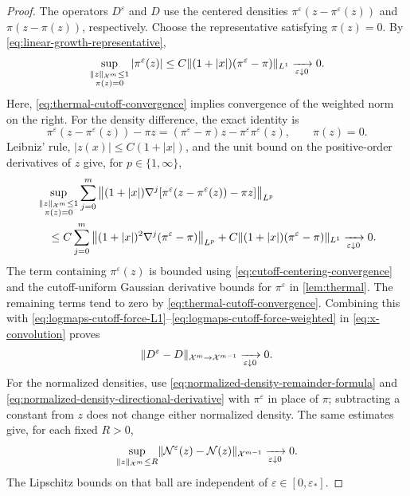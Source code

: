 \documentclass[11pt,reqno]{amsart}
\numberwithin{equation}{section}
\theoremstyle{plain}
\theoremstyle{remark}
\DeclarePairedDelimiter{\norm}{\lVert}{\rVert}
\newcommand{\Xspace}{\mathcal X}
\begin{document}
\begin{proof}
The operators $D^\varepsilon$ and $D$ use the centered densities $\pi^\varepsilon(z-\pi^\varepsilon(z))$ and $\pi(z-\pi(z))$, respectively. Choose the representative satisfying $\pi(z)=0$. By \eqref{eq:linear-growth-representative},
\begin{equation}\label{eq:cutoff-centering-convergence}
 \sup_{\substack{\norm z_{\Xspace^m}\le1\\ \pi(z)=0}}|\pi^\varepsilon(z)|
 \le C\norm{(1+|x|)(\pi^\varepsilon-\pi)}_{L^1}
 \xrightarrow[\varepsilon\downarrow0]{}0.
\end{equation}
Here, \eqref{eq:thermal-cutoff-convergence} implies convergence of the weighted norm on the right. For the density difference, the exact identity is
\begin{equation}\label{eq:cutoff-centered-density-difference}
 \pi^\varepsilon(z-\pi^\varepsilon(z))-\pi z
 =(\pi^\varepsilon-\pi)z-\pi^\varepsilon\pi^\varepsilon(z),
 \qquad \pi(z)=0.
\end{equation}
Leibniz' rule, $|z(x)|\le C(1+|x|)$, and the unit bound on the positive-order derivatives of $z$ give, for $p\in\{1,\infty\}$,
\begin{align}
 &\sup_{\substack{\norm z_{\Xspace^m}\le1\\ \pi(z)=0}}
   \sum_{j=0}^m\left\|(1+|x|)\nabla^j
       [\pi^\varepsilon(z-\pi^\varepsilon(z))-\pi z]\right\|_{L^p}\notag\\
 &\quad\le C\sum_{j=0}^m
       \left\|(1+|x|)^2\nabla^j(\pi^\varepsilon-\pi)\right\|_{L^p}
       +C\norm{(1+|x|)(\pi^\varepsilon-\pi)}_{L^1}
 \xrightarrow[\varepsilon\downarrow0]{}0.
 \label{eq:cutoff-centered-density-norms}
\end{align}
The term containing $\pi^\varepsilon(z)$ is bounded using \eqref{eq:cutoff-centering-convergence} and the cutoff-uniform Gaussian derivative bounds for $\pi^\varepsilon$ in \cref{lem:thermal}. The remaining terms tend to zero by \eqref{eq:thermal-cutoff-convergence}. Combining this with \eqref{eq:logmaps-cutoff-force-L1}--\eqref{eq:logmaps-cutoff-force-weighted} in \eqref{eq:x-convolution} proves
\begin{equation}\label{eq:cutoff-D-convergence}
 \norm{D^\varepsilon-D}_{\Xspace^m\to\Xspace^{m-1}}
 \xrightarrow[\varepsilon\downarrow0]{}0.
\end{equation}
For the normalized densities, use \eqref{eq:normalized-density-remainder-formula} and \eqref{eq:normalized-density-directional-derivative} with $\pi^\varepsilon$ in place of $\pi$; subtracting a constant from $z$ does not change either normalized density. The same estimates give, for each fixed $R>0$,
\begin{equation}\label{eq:cutoff-N-convergence-explicit}
 \sup_{\norm z_{\Xspace^m}\le R}
 \norm{\mathcal N^\varepsilon(z)-\mathcal N(z)}_{\Xspace^{m-1}}
 \xrightarrow[\varepsilon\downarrow0]{}0.
\end{equation}
The Lipschitz bounds on that ball are independent of $\varepsilon\in[0,\varepsilon_*]$.
\end{proof}
\end{document}
